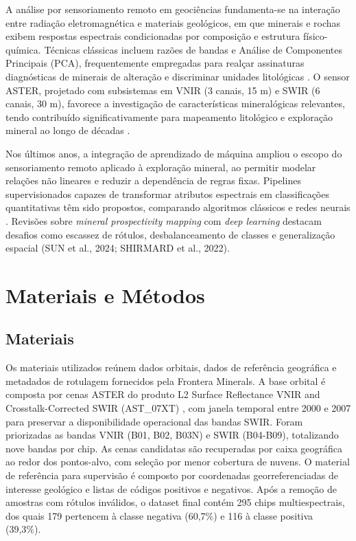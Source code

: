 \documentclass[12pt,twocolumn]{article}
\begin{document}
A análise por sensoriamento remoto em geociências fundamenta-se na interação entre radiação eletromagnética e materiais geológicos, em que minerais e rochas exibem respostas espectrais condicionadas por composição e estrutura físico-química. Técnicas clássicas incluem razões de bandas e Análise de Componentes Principais (PCA), frequentemente empregadas para realçar assinaturas diagnósticas de minerais de alteração e discriminar unidades litológicas \cite{abrams2019, rowan2003}. O sensor ASTER, projetado com subsistemas em VNIR (3 canais, 15 m) e SWIR (6 canais, 30 m), favorece a investigação de características mineralógicas relevantes, tendo contribuído significativamente para mapeamento litológico e exploração mineral ao longo de décadas \cite{abrams2019, ramsey2020}.

Nos últimos anos, a integração de aprendizado de máquina ampliou o escopo do sensoriamento remoto aplicado à exploração mineral, ao permitir modelar relações não lineares e reduzir a dependência de regras fixas. Pipelines supervisionados capazes de transformar atributos espectrais em classificações quantitativas têm sido propostos, comparando algoritmos clássicos e redes neurais \cite{bahrami2024}. Revisões sobre \emph{mineral prospectivity mapping} com \emph{deep learning} destacam desafios como escassez de rótulos, desbalanceamento de classes e generalização espacial (SUN et al., 2024; SHIRMARD et al., 2022).

\section{Materiais e Métodos}\label{materiais-e-muxe9todos}

\subsection{Materiais}\label{materiais}

Os materiais utilizados reúnem dados orbitais, dados de referência geográfica e metadados de rotulagem fornecidos pela Frontera Minerals. A base orbital é composta por cenas ASTER do produto L2 Surface Reflectance VNIR and Crosstalk-Corrected SWIR (AST\_07XT) \cite{nasa_aster}, com janela temporal entre 2000 e 2007 para preservar a disponibilidade operacional das bandas SWIR. Foram priorizadas as bandas VNIR (B01, B02, B03N) e SWIR (B04-B09), totalizando nove bandas por chip. As cenas candidatas são recuperadas por caixa geográfica ao redor dos pontos-alvo, com seleção por menor cobertura de nuvens. O material de referência para supervisão é composto por coordenadas georreferenciadas de interesse geológico e listas de códigos positivos e negativos. Após a remoção de amostras com rótulos inválidos, o dataset final contém 295 chips multiespectrais, dos quais 179 pertencem à classe negativa (60,7\%) e 116 à classe positiva (39,3\%).
\end{document}
